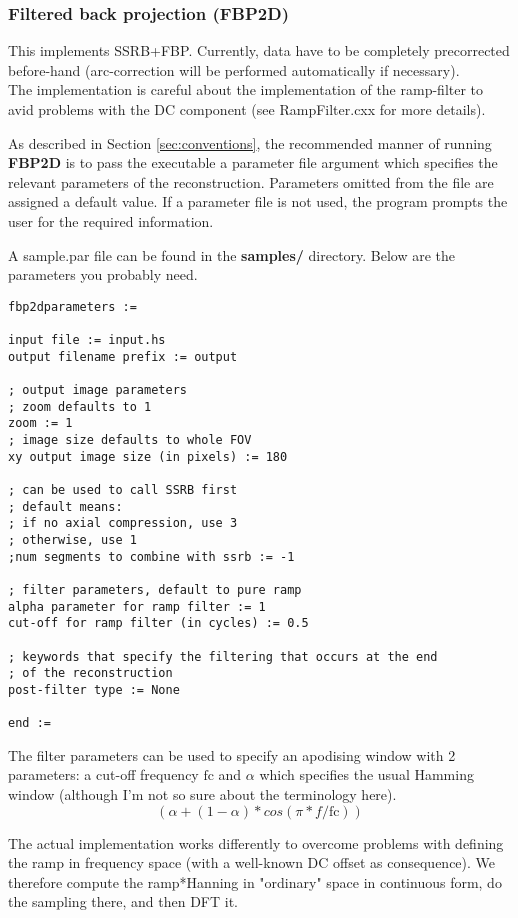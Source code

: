 \documentclass{article}
\begin{document}
\subsubsection{
Filtered back projection (FBP2D)}

This implements SSRB+FBP. Currently, data have to be completely 
precorrected before-hand (arc-correction will be performed automatically
if necessary).\\
The implementation is careful about the implementation of the 
ramp-filter to avid problems with the DC component (see RampFilter.cxx 
for more details).



As described in Section \ref{sec:conventions}, the recommended manner of running \textbf{FBP2D}  
is to pass the executable a parameter file argument which specifies 
the relevant parameters of the reconstruction. Parameters omitted 
from the file are assigned a default value. If a parameter file 
is not used, the program prompts the user for the required information.


A sample.par file can be found in the \textbf{samples/} directory. 
Below are the parameters you probably need.


\begin{verbatim}
fbp2dparameters :=

input file := input.hs
output filename prefix := output

; output image parameters
; zoom defaults to 1
zoom := 1
; image size defaults to whole FOV
xy output image size (in pixels) := 180

; can be used to call SSRB first
; default means: 
; if no axial compression, use 3 
; otherwise, use 1
;num segments to combine with ssrb := -1

; filter parameters, default to pure ramp
alpha parameter for ramp filter := 1
cut-off for ramp filter (in cycles) := 0.5

; keywords that specify the filtering that occurs at the end
; of the reconstruction
post-filter type := None

end := 
\end{verbatim}

The filter parameters can be used to specify an apodising window with 2 parameters: 
a cut-off frequency $\mathrm{fc}$ and $\alpha$ which specifies the usual 
  Hamming window (although I'm not so sure about the terminology here). 
\[
   (\alpha + (1 - \alpha) * cos(\pi * f / \mathrm{fc}))
\]

  The actual implementation works differently to overcome problems with defining the ramp in frequency 
  space (with a well-known DC offset as consequence). We therefore compute the ramp*Hanning in 
  "ordinary" space in continuous form, do the sampling there, and then DFT it. 
\end{document}
